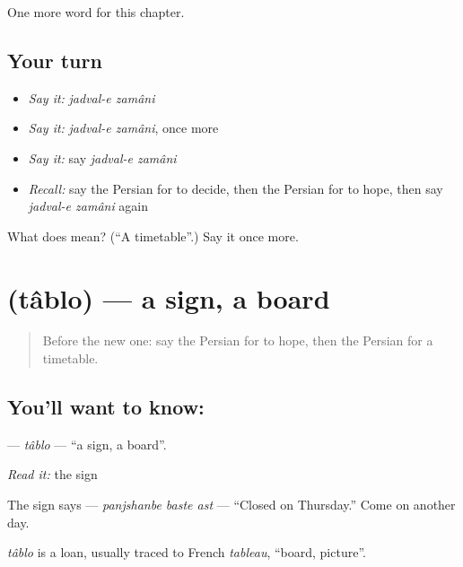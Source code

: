 \begin{grammarlens}[title={What you've built}]
One more word for this chapter.
\end{grammarlens}

\subsection*{Your turn}
\begin{itemize}
\raggedright
  \item \emph{Say it:} \emph{jadval-e zamâni}
  \item \emph{Say it:} \emph{jadval-e zamâni}, once more
  \item \emph{Say it:} say \emph{jadval-e zamâni}
  \item \emph{Recall:} say the Persian for to decide, then the Persian for to hope, then say \emph{jadval-e zamâni} again
\end{itemize}

\begin{tcolorbox}[breakable,colback=teal!4,colframe=teal!35!black,title={Before you move on}]
What does   mean? (\textquotedblleft{}A timetable\textquotedblright{}.) Say it once more.
\end{tcolorbox}
\section[\texorpdfstring{\fa{تابلو} (tâblo)}{تابلو (tâblo)}]{ (tâblo) — a sign, a board}

\label{lesson:FA-C139-tablo}



\begin{quote}
Before the new one: say the Persian for to hope, then the Persian for a timetable.
\end{quote}

\subsection*{You'll want to know: }
\textbf{} — \emph{tâblo} — \textquotedblleft{}a sign, a board\textquotedblright{}.

\emph{Read it:} the sign

The sign says \textbf{  } — \emph{panjshanbe baste ast} — \textquotedblleft{}Closed on Thursday.\textquotedblright{} Come on another day.

\begin{cousinweb}
\emph{tâblo} is a loan, usually traced to French \emph{tableau}, \textquotedblleft{}board, picture\textquotedblright{}.
\end{cousinweb}

